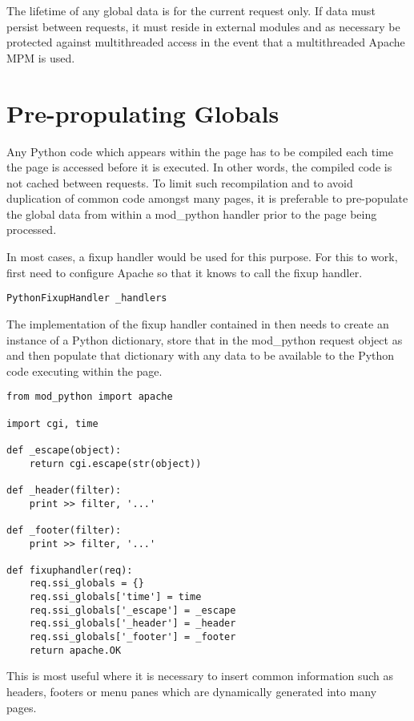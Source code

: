 The lifetime of any global data is for the current request only. If data
must persist between requests, it must reside in external modules and as
necessary be protected against multithreaded access in the event that a
multithreaded Apache MPM is used.

\section{Pre-propulating Globals\label{ssi-globals}}

Any Python code which appears within the page has to be compiled each time
the page is accessed before it is executed. In other words, the compiled
code is not cached between requests. To limit such recompilation and to
avoid duplication of common code amongst many pages, it is preferable to
pre-populate the global data from within a mod_python handler prior to the
page being processed.

In most cases, a fixup handler would be used for this purpose. For this to
work, first need to configure Apache so that it knows to call the fixup
handler.

\begin{verbatim}
PythonFixupHandler _handlers
\end{verbatim}

The implementation of the fixup handler contained in 
then needs to create an instance of a Python dictionary, store that in the
mod_python request object as  and then populate that
dictionary with any data to be available to the Python code executing
within the page.

\begin{verbatim}
from mod_python import apache

import cgi, time

def _escape(object):
    return cgi.escape(str(object))

def _header(filter):
    print >> filter, '...'

def _footer(filter):
    print >> filter, '...'

def fixuphandler(req):
    req.ssi_globals = {}
    req.ssi_globals['time'] = time
    req.ssi_globals['_escape'] = _escape
    req.ssi_globals['_header'] = _header
    req.ssi_globals['_footer'] = _footer
    return apache.OK
\end{verbatim}

This is most useful where it is necessary to insert common information such
as headers, footers or menu panes which are dynamically generated into many
pages.

